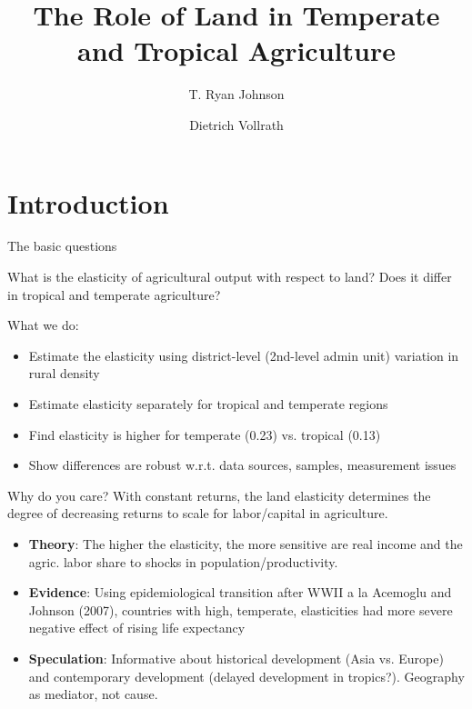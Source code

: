 \documentclass[10pt, xcolor=dvipsnames]{beamer}
\title[Land Constraints]{{The Role of Land in Temperate and Tropical Agriculture}}
\author[Johnson \& Vollrath]{T. Ryan Johnson \inst{1} \and Dietrich Vollrath \inst{2}}
\institute[UH]{\inst{1} Washington University \and %
                      \inst{2} University of Houston}
\date[November 2018]{}
\begin{document}
\maketitle

\section{Introduction}

\begin{frame}{The basic questions}\label{define}

What is the elasticity of agricultural output with respect to land? Does it differ in tropical and temperate agriculture? 

\vspace{.25in}\noindent What we do: 
\begin{itemize}
  \item Estimate the elasticity using district-level (2nd-level admin unit) variation in rural density
  \item Estimate elasticity separately for tropical and temperate regions
  \item Find elasticity is higher for temperate (0.23) vs. tropical (0.13)
  \item Show differences are robust w.r.t. data sources, samples, measurement issues
\end{itemize}

\end{frame}


\begin{frame}{Why do you care?}
With constant returns, the land elasticity determines the degree of decreasing returns to scale for labor/capital in agriculture. 

\begin{itemize}
  \item \textbf{Theory}: The higher the elasticity, the more sensitive are real income and the agric. labor share to shocks in population/productivity.
  \item \textbf{Evidence}: Using epidemiological transition after WWII a la Acemoglu and Johnson (2007), countries with high, temperate, elasticities had more severe negative effect of rising life expectancy
  \item \textbf{Speculation}: Informative about historical development (Asia vs. Europe) and contemporary development (delayed development in tropics?). Geography as mediator, not cause.
\end{itemize}

\end{frame}
\end{document}

